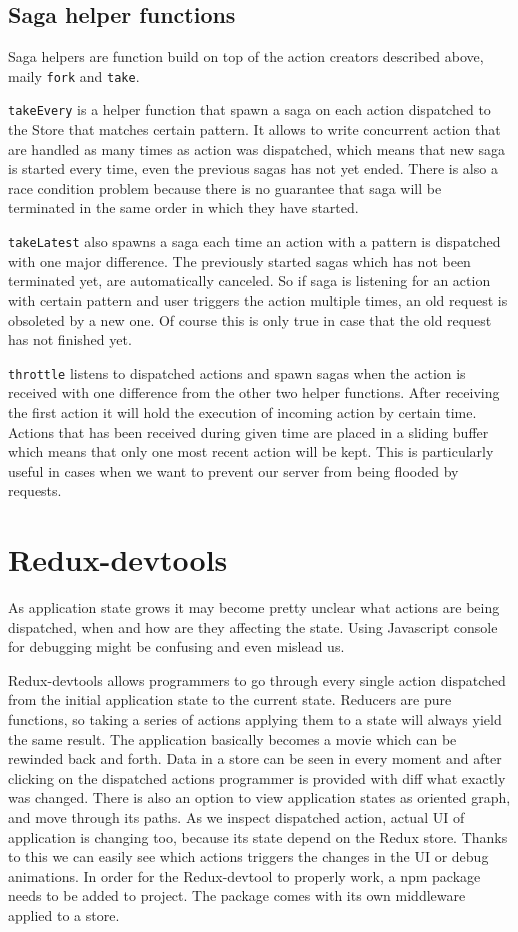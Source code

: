 \subsection{Saga helper functions}
Saga helpers are function build on top of the action creators described above, maily \texttt{fork} and \texttt{take}.

\texttt{takeEvery} is a helper function that spawn a saga on each action dispatched to the Store that matches certain pattern. It allows to write concurrent action that are handled as many times as action was dispatched, which means that new saga is started every time, even the previous sagas has not yet ended. There is also a race condition problem because there is no guarantee that saga will be terminated in the same order in which they have started.

\texttt{takeLatest} also spawns a saga each time an action with a pattern is dispatched with one major difference. The previously started sagas which has not been terminated yet, are automatically canceled. So if saga is listening for an action with certain pattern and user triggers the action multiple times, an old request is obsoleted by a new one. Of course this is only true in case that the old request has not finished yet.

\texttt{throttle} listens to dispatched actions and spawn sagas when the action is received with one difference from the other two helper functions. After receiving the first action it will hold the execution of incoming action by certain time. Actions that has been received during given time are placed in a sliding buffer which means that only one most recent action will be kept. This is particularly useful in cases when we want to prevent our server from being flooded by requests.

\section{Redux-devtools}
As application state grows it may become pretty unclear what actions are being dispatched, when and how are they affecting the state. Using Javascript console for debugging might be confusing and even mislead us.

Redux-devtools allows programmers to go through every single action dispatched from the initial application state to the current state. Reducers are pure functions, so taking a series of actions applying them to a state will always yield the same result. The application basically becomes a movie which can be rewinded back and forth. Data in a store can be seen in every moment and after clicking on the dispatched actions programmer is provided with diff what exactly was changed. There is also an option to view application states as oriented graph, and move through its paths. As we inspect dispatched action, actual UI of application is changing too, because its state depend on the Redux store. Thanks to this we can easily see which actions triggers the changes in the UI or debug animations. In order for the Redux-devtool to properly work, a npm package needs to be added to project. The package comes with its own middleware applied to a store. 

